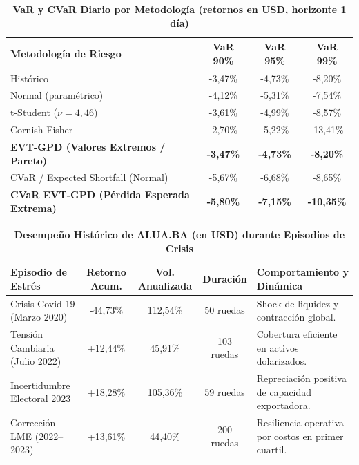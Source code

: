\documentclass[11pt,a4paper]{article}
\begin{document}
\begin{table}[H]
\centering
\caption{\textbf{VaR y CVaR Diario por Metodología (retornos en USD, horizonte 1 día)}}
\small
\begin{tabularx}{\textwidth}{Xccc}
\toprule
\textbf{Metodología de Riesgo} & \textbf{VaR 90\%} & \textbf{VaR 95\%} & \textbf{VaR 99\%} \\
\midrule
Histórico & -3,47\% & -4,73\% & -8,20\% \\
Normal (paramétrico) & -4,12\% & -5,31\% & -7,54\% \\
t-Student ($\nu=4,46$) & -3,61\% & -4,99\% & -8,57\% \\
Cornish-Fisher & -2,70\% & -5,22\% & -13,41\% \\
\textbf{EVT-GPD (Valores Extremos / Pareto)} & \textbf{-3,47\%} & \textbf{-4,73\%} & \textbf{-8,20\%} \\
CVaR / Expected Shortfall (Normal) & -5,67\% & -6,68\% & -8,65\% \\
\textbf{CVaR EVT-GPD (Pérdida Esperada Extrema)} & \textbf{-5,80\%} & \textbf{-7,15\%} & \textbf{-10,35\%} \\
\bottomrule
\end{tabularx}
\end{table}

\begin{table}[H]
\centering
\caption{\textbf{Desempeño Histórico de ALUA.BA (en USD) durante Episodios de Crisis}}
\scriptsize
\begin{tabularx}{\textwidth}{>{\raggedright\arraybackslash}p{3.6cm}ccc>{\raggedright\arraybackslash}X}
\toprule
\textbf{Episodio de Estrés} & \textbf{Retorno Acum.} & \textbf{Vol. Anualizada} & \textbf{Duración} & \textbf{Comportamiento y Dinámica} \\
\midrule
Crisis Covid-19 (Marzo 2020) & -44,73\% & 112,54\% & 50 ruedas & Shock de liquidez y contracción global. \\
Tensión Cambiaria (Julio 2022) & +12,44\% & 45,91\% & 103 ruedas & Cobertura eficiente en activos dolarizados. \\
Incertidumbre Electoral 2023 & +18,28\% & 105,36\% & 59 ruedas & Repreciación positiva de capacidad exportadora. \\
Corrección LME (2022--2023) & +13,61\% & 44,40\% & 200 ruedas & Resiliencia operativa por costos en primer cuartil. \\
\bottomrule
\end{tabularx}
\end{table}
\end{document}
